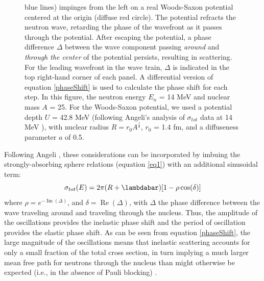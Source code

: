 \documentclass[twocolumn,secnumarabic,amssymb, nobibnotes, aps, prl,
superscriptaddress, nobalancelastpage]{revtex4}
\newcommand{\tots}{\ensuremath{\sigma_{tot}}\,\,}
\newcommand{\totE}{\ensuremath{\sigma_{tot}}(E)}
\begin{document}
\begin{figure}
\begin{minipage}{0.5\textwidth}
{            blue lines) impinges from the left on a real Woods-Saxon
            potential centered at the origin (diffuse red circle). The potential
            refracts the neutron wave,
            retarding the phase of the wavefront as it passes through the
            potential. After escaping the potential, a phase difference $\Delta$ between
            the wave component passing \textit{around} and \textit{through the center}
            of the potential persists, resulting in scattering.
            For the leading wavefront in the wave train, $\Delta$ is indicated in
            the top right-hand corner of each panel. A differential version of equation 
            \ref{phaseShift} is used to
            calculate the phase shift for each step. In this figure, the neutron
            energy $E_{n}$ = 14 MeV and nuclear mass $A$ = 25. For the Woods-Saxon potential,
            we used a potential depth $U$ = 42.8 MeV (following Angeli's analysis
            of \tots data at 14 MeV \cite{Angeli1970}), with nuclear radius $R = 
            r_{0}A^{\frac{1}{3}}$, $r_{0}$ = 1.4 fm, and a diffuseness parameter
        $a$ of 0.5.}
        \label{RamsauerPhaseShiftFigure}
    \end{minipage}
\end{figure}


Following Angeli \cite{Angeli1970}, these considerations can be incorporated by
imbuing the strongly-absorbing sphere relations (equation \ref{eq1}) with an additional sinusoidal term:
\begin{equation}
    \totE = 2\pi (R+\lambdabar)[1 - \rho \cos(\delta)]
\end{equation}
where $\rho = e^{-\operatorname{Im}(\Delta)}$, and $\delta =
\operatorname{Re}(\Delta)$, with $\Delta$ the phase difference between the wave traveling
around and traveling through the nucleus. Thus, the amplitude of the oscillations provides the 
inelastic phase shift and the period of oscillation provides the elastic phase shift.
As can be seen from equation 
\ref{phaseShift}, the large magnitude of the oscillations means that inelastic
scattering accounts for only a small fraction of the total cross section, in turn implying a 
much larger mean free path for neutrons through the nucleus 
than might otherwise be expected (i.e., in the absence of Pauli blocking)
\cite{Mohr1955}.
\end{document}
